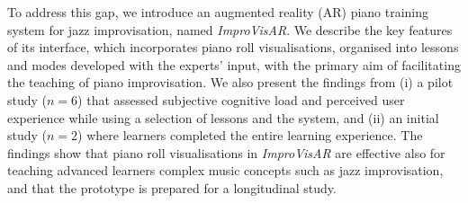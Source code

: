 \documentclass{vgtc}                          %
\begin{document}
\par To address this gap, we introduce an augmented reality (AR) piano  training system for jazz improvisation, named \textit{ImproVisAR}. We describe the key features of its interface, which incorporates piano roll visualisations, organised into lessons and modes developed with the experts' input, with the primary aim of facilitating the teaching of piano improvisation. We also present the findings from (i) a pilot study ($n=6$) that assessed subjective cognitive load and perceived user experience while using a selection of lessons and the system, and (ii) an initial study ($n=2$) where learners completed the entire learning experience. The findings show that piano roll visualisations in \textit{ImproVisAR} are effective also for teaching advanced learners complex music concepts such as jazz improvisation, and that the prototype is prepared for a longitudinal study. 


\end{document}
